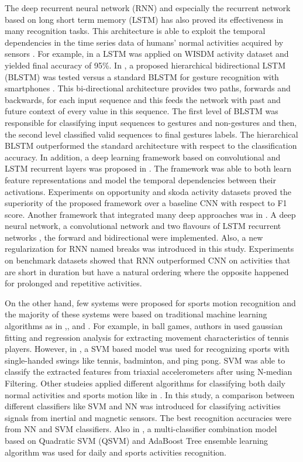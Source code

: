 \documentclass[12pt,a4paper]{article}
\begin{document}
The deep recurrent neural network (RNN) and especially the recurrent network based on long short term memory (LSTM) has also proved its effectiveness in many recognition tasks. This architecture is able to exploit the temporal dependencies in the time series data of humans' normal activities acquired by sensors \cite{hammerla2016deep}. For example, in \cite{chen2016lstm} a LSTM was applied on WISDM activity dataset and yielded final accuracy of 95\%. In \cite{lee2012mobile},  a proposed hierarchical bidirectional LSTM (BLSTM) was tested versus a standard BLSTM for gesture recognition with smartphones . This bi-directional architecture provides two paths, forwards and backwards, for each input sequence and this feeds the network with past and future context of every value in this sequence. The first level of BLSTM was responsible for classifying input  sequences to gestures and non-gestures and then, the second level classified valid sequences to final gestures labels. The hierarchical BLSTM outperformed the standard architecture with respect to the classification accuracy. In addition, a deep learning framework based on convolutional and LSTM recurrent layers was proposed in \cite{ordonez2016deep}. The framework was able to both learn feature representations and model the temporal dependencies between their activations. Experiments on opportunity and skoda activity datasets proved the superiority of the proposed framework over a baseline CNN with respect to F1 score. Another framework that integrated many deep approaches was in \cite{hammerla2016deep}. A deep neural network, a convolutional network and two flavours of LSTM recurrent networks , the forward and bidirectional were implemented. Also, a new regularization for RNN named breaks was introduced in this study. Experiments on benchmark datasets showed that RNN outperformed CNN on activities that are short in duration but have a natural ordering where the opposite happened for prolonged and repetitive activities.


On the other hand, few systems were proposed for sports motion recognition and the majority of these systems were based on traditional machine learning algorithms as in \cite{fuji2011development} ,\cite{barshan2014recognizing},\cite{lu2016multi} and \cite{wang2015sport}. For example, in ball games, authors in \cite{fuji2011development} used gaussian fitting and regression analysis for extracting movement characteristics of tennis players. However, in \cite{wang2015sport}, a SVM based model was used for recognizing sports with single-handed swings like tennis, badminton, and ping pong. SVM was able to classify the extracted features from triaxial accelerometers after using N-median Filtering. Other studeies applied different algorithms for classifying both daily normal activities and sports motion like in \cite{barshan2014recognizing}. In this study, a comparison between different classifiers like SVM and NN was introduced for classifying activities signals from inertial and magnetic sensors. The best recognition accuracies were from NN and SVM classifiers. Also in  \cite{lu2016multi}, a multi-classifier combination model based on Quadratic SVM (QSVM) and AdaBoost Tree ensemble learning algorithm was used for daily and sports activities recognition.
\end{document}
